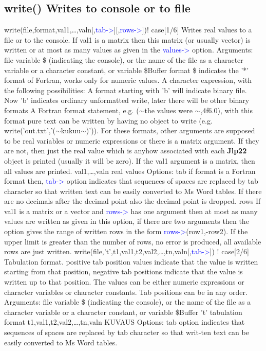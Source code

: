\subsection{\textcolor{VioletRed}{write}() Writes to console or to file}
\label{write}
\textcolor{VioletRed}{write}(file,format,val1,…,valn[,\textcolor{blue}{tab->}][,\textcolor{blue}{rows->}])! case[1/6]
Writes real values to a file or to the console. If val1 is a matrix then this matrix (or usually
vector) is written or at most as many values as given in the \textcolor{blue}{values->} option.
Arguments:
file variable \$ (indicating the console), or the name of the file as a character variable
or a character constant, or variable \$Buffer
format
\$ indicates the '*' format of Fortran, works only for numeric values.
A character expression, with the following possibilities:
A format starting with 'b' will indicate binary file. Now 'b' indicates ordinary
unformatted write, later there will be other binary formats
A Fortran format statement, e.g. ($\sim$the values were $\sim$,4f6.0), with this
format pure text can be written by having no object to write (e.g.
\textcolor{VioletRed}{write}('out.txt','($\sim$kukuu$\sim$)')).
For these formats, other arguments are supposed to be real variables or numeric
expressions or there is a matrix argument. If they are not, then just the real value
which is anyhow associated with each \textbf{Jlp22} object is printed (usually it will be zero).
If the val1 argument is a matrix, then all values are printed.
val1,…,valn
real values
Options:
tab if format is a Fortran format then, \textcolor{blue}{tab->} option indicates that sequences of
spaces are replaced by tab character so that written text can be easily converted
to Ms Word tables. If there are no decimals after the decimal point also the
decimal point is dropped.
rows If val1 is a matrix or a vector and \textcolor{blue}{rows->} has one argument then at most as
many values are written as given in this option, if there are two arguments then
the option gives the range of written rows in the form \textcolor{blue}{rows->}(row1,-row2). If the
upper limit is greater than the number of rows, no error is produced, all available
rows are just written.
\textcolor{VioletRed}{write}(file,'t',t1,val1,t2,val2,…,tn,valn[,\textcolor{blue}{tab->}]) ! case[2/6]
Tabulation format. positive tab position values indicate that the value is written starting from
that position, negative tab positions indicate that the value is written up to that position. The
values can be either numeric expressions or character variables or character constants. Tab
positions can be in any order.
Arguments:
file variable \$ (indicating the console), or the name of the file as a character variable
or a character constant, or variable \$Buffer
't' tabulation format
t1,val1,t2,val2,…,tn,valn
KUVAUS
Options:
tab option indicates that sequences of spaces are replaced by tab character so that
writ-ten text can be easily converted to Ms Word tables.

